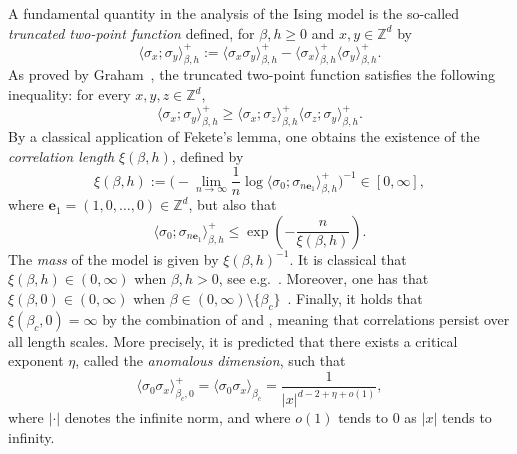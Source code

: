 \documentclass[11pt,a4paper]{article}
\numberwithin{equation}{section}
\theoremstyle{plain}
\theoremstyle{definition}
\begin{document}
A fundamental quantity in the analysis of the Ising model is the so-called \emph{truncated two-point function} defined, for $\beta,h\geq 0$ and $x,y\in \mathbb Z^d$ by
\begin{equation}
	\langle \sigma_x;\sigma_y\rangle_{\beta,h}^+:=\langle \sigma_x\sigma_y\rangle_{\beta,h}^+-\langle \sigma_x\rangle_{\beta,h}^+\langle \sigma_y\rangle_{\beta,h}^+.
\end{equation}
As proved by Graham~\cite{graham1982correlation}, the truncated two-point 
function satisfies the following inequality: for every $x,y,z\in\mathbb{Z}^d$,
\begin{equation}
    \langle\sigma_x;\sigma_y\rangle_{\beta,h}^+
    \geq\langle\sigma_x;\sigma_z\rangle_{\beta,h}^+
    \langle\sigma_z;\sigma_y\rangle_{\beta,h}^+.
\end{equation}
By a classical application of Fekete's lemma, one obtains the existence 
of the \emph{correlation length} $\xi(\beta,h)$, defined by
\begin{equation}\label{eq:def correlation length intro}
    \xi(\beta,h)
    :=\Big(
       -\lim_{n\to\infty}\frac{1}{n}
       \log\langle\sigma_0;\sigma_{n\mathbf{e}_1}\rangle_{\beta,h}^+
    \Big)^{-1}\in [0,\infty],
\end{equation}
where $\mathbf{e}_1=(1,0,\ldots,0)\in \mathbb Z^d$, but also that
\begin{equation}\label{eq:bound truncated fekete}
	\langle \sigma_0;\sigma_{n\mathbf{e}_1}\rangle_{\beta,h}^+\leq \exp\left(-\frac{n}{\xi(\beta,h)}\right).
\end{equation}
The \emph{mass} of the model is given by $\xi(\beta,h)^{-1}$.
It is classical that $\xi(\beta,h)\in(0,\infty)$ when $\beta,h>0$, see e.g.~\cite[Theorem~1.2]{ott2020sharp}. Moreover, one has that $\xi(\beta,0)\in(0,\infty)$ 
when $\beta\in (0,\infty)\setminus\{\beta_c\}$~\cite{AizenmanBarskyFernandezSharpnessIsing1987,DuminilTassionNewProofSharpness2016,duminil2020exponential}. Finally, it holds that $\xi(\beta_c,0)=\infty$ by the combination of \cite{SimonInequalityIsing1980} and \cite{AizenmanDuminilSidoraviciusContinuityIsing2015}, meaning that correlations persist over all length scales. More precisely, it is predicted \cite{Widom1965equation} that there exists a critical exponent $\eta$, called the \emph{anomalous dimension}, such that
\begin{equation}\label{eq:def eta}
	\langle \sigma_0\sigma_x\rangle_{\beta_c,0}^+=\langle \sigma_0\sigma_x\rangle_{\beta_c}=\frac{1}{|x|^{d-2+\eta+o(1)}},
\end{equation}
where $|\cdot|$ denotes the infinite norm, and where $o(1)$ tends to $0$ as $|x|$ tends to infinity. 
\end{document}
